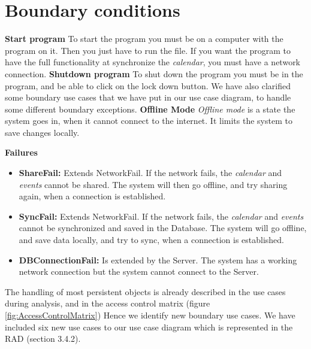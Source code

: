 \section{Boundary conditions}
\textbf{Start program}
To start the program you must be on a computer with the program on it. Then you just have to run the file. If you want the program to have the full functionality at synchronize the \textit{calendar}, you must have a network connection. 
\newline
\newline
\textbf{Shutdown program}
To shut down the program you must be in the program, and be able to click on the lock down button. 
We have also clarified some boundary use cases that we have put in our use case diagram, to handle some different boundary exceptions. 
\newline
\newline
\textbf{Offline Mode}
\textit{Offline mode} is a state the system goes in, when it cannot connect to the internet. It limits the system to save changes locally. 

\textbf{Failures}
\begin{itemize}
	\item \textbf{ShareFail:} Extends NetworkFail. If the network fails, the \textit{calendar} and \textit{events} cannot be shared. The system will then go offline, and try sharing again, when a connection is established. 
	\item \textbf{SyncFail:} Extends NetworkFail. If the network fails, the \textit{calendar} and \textit{events} cannot be synchronized and saved in the Database. The system will go offline, and save data locally, and try to sync, when a connection is established.
	\item \textbf{DBConnectionFail:} Is extended by the Server. The system has a working network connection but the system cannot connect to the Server. 
\end{itemize}
The handling of most persistent objects is already described in the use cases during analysis, and in the access control matrix (figure \ref{fig:AccessControlMatrix}) 
Hence we identify new boundary use cases. We have included six new use cases to our use case diagram which is represented in the RAD (section 3.4.2). 
